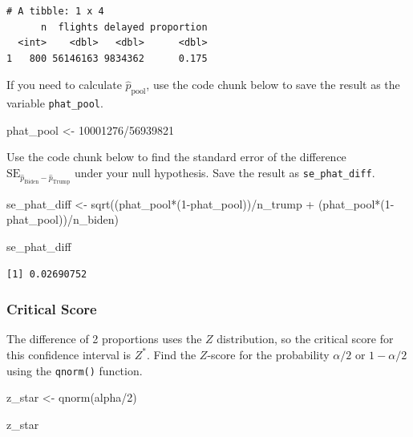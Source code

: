 \documentclass[
  letterpaper,
  DIV=11,
  numbers=noendperiod]{scrartcl}
\newenvironment{Shaded}{\begin{snugshade}}{\end{snugshade}}
\newcommand{\DecValTok}[1]{\textcolor[rgb]{0.68,0.00,0.00}{#1}}
\newcommand{\FunctionTok}[1]{\textcolor[rgb]{0.28,0.35,0.67}{#1}}
\newcommand{\NormalTok}[1]{\textcolor[rgb]{0.00,0.23,0.31}{#1}}
\newcommand{\OtherTok}[1]{\textcolor[rgb]{0.00,0.23,0.31}{#1}}
\newcommand{\SpecialCharTok}[1]{\textcolor[rgb]{0.37,0.37,0.37}{#1}}
\begin{document}
\begin{verbatim}
# A tibble: 1 x 4
      n  flights delayed proportion
  <int>    <dbl>   <dbl>      <dbl>
1   800 56146163 9834362      0.175
\end{verbatim}

If you need to calculate \(\hat{p}_{\text{pool}}\), use the code chunk
below to save the result as the variable \texttt{phat\_pool}.

\begin{Shaded}
\begin{Highlighting}[]
\NormalTok{phat\_pool }\OtherTok{\textless{}{-}} \DecValTok{10001276}\SpecialCharTok{/}\DecValTok{56939821}
\end{Highlighting}
\end{Shaded}

Use the code chunk below to find the standard error of the difference
\(\text{SE}_{\hat{p}_{\text{Biden}}-\hat{p}_{\text{Trump}}}\) under your
null hypothesis. Save the result as \texttt{se\_phat\_diff}.

\begin{Shaded}
\begin{Highlighting}[]
\NormalTok{se\_phat\_diff }\OtherTok{\textless{}{-}} \FunctionTok{sqrt}\NormalTok{((phat\_pool}\SpecialCharTok{*}\NormalTok{(}\DecValTok{1}\SpecialCharTok{{-}}\NormalTok{phat\_pool))}\SpecialCharTok{/}\NormalTok{n\_trump }\SpecialCharTok{+}\NormalTok{ (phat\_pool}\SpecialCharTok{*}\NormalTok{(}\DecValTok{1}\SpecialCharTok{{-}}\NormalTok{phat\_pool))}\SpecialCharTok{/}\NormalTok{n\_biden)}

\NormalTok{se\_phat\_diff}
\end{Highlighting}
\end{Shaded}

\begin{verbatim}
[1] 0.02690752
\end{verbatim}

\subsubsection{Critical Score}\label{critical-score}

The difference of 2 proportions uses the \(Z\) distribution, so the
critical score for this confidence interval is \(Z^*\). Find the
\(Z\)-score for the probability \(\alpha/2\) or \(1-\alpha/2\) using the
\texttt{qnorm()} function.

\begin{Shaded}
\begin{Highlighting}[]
\NormalTok{z\_star }\OtherTok{\textless{}{-}} \FunctionTok{qnorm}\NormalTok{(alpha}\SpecialCharTok{/}\DecValTok{2}\NormalTok{)}

\NormalTok{z\_star}
\end{Highlighting}
\end{Shaded}
\end{document}
